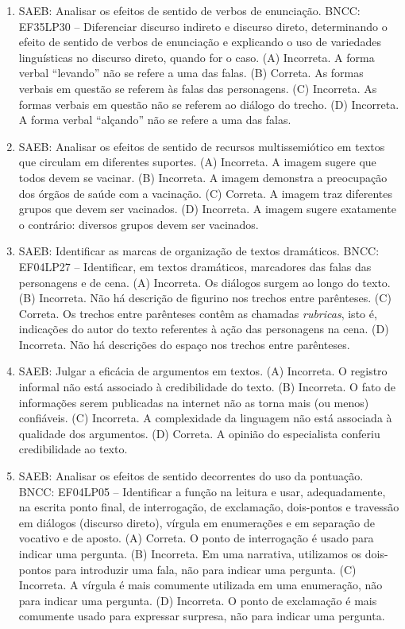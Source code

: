\begin{enumerate}
\item
SAEB: Analisar os efeitos de sentido de verbos de enunciação. BNCC: EF35LP30 -- Diferenciar discurso indireto e discurso direto, determinando o efeito de sentido de verbos de enunciação e explicando o uso de variedades linguísticas no discurso direto, quando for o caso. 
(A) Incorreta. A forma verbal ``levando'' não se refere a uma das falas. 
(B) Correta. As formas verbais em questão se referem às falas das personagens. 
(C) Incorreta. As formas verbais em questão não se referem ao diálogo do trecho. 
(D) Incorreta. A forma verbal  ``alçando'' não se refere a uma das falas.

\item
SAEB: Analisar os efeitos de sentido de recursos multissemiótico em textos que circulam em diferentes suportes. 
(A) Incorreta. A imagem sugere que todos devem se vacinar. 
(B) Incorreta.  A imagem demonstra a preocupação dos órgãos de saúde com a vacinação. 
(C) Correta. A imagem traz diferentes grupos que devem ser vacinados. 
(D) Incorreta. A imagem sugere exatamente o contrário: diversos grupos devem ser vacinados.

\item
SAEB: Identificar as marcas de organização de textos dramáticos. BNCC: EF04LP27 -- Identificar, em textos dramáticos, marcadores das falas das personagens e de cena.
(A) Incorreta. Os diálogos surgem ao longo do texto. 
(B) Incorreta. Não há descrição de figurino nos trechos entre parênteses. 
(C) Correta. Os trechos entre parênteses contêm as chamadas \textit{rubricas}, isto é, indicações do autor do texto referentes à ação das personagens na cena. 
(D) Incorreta. Não há descrições do espaço nos trechos entre parênteses.

\item
SAEB: Julgar a eficácia de argumentos em textos. 
(A) Incorreta. O registro informal não está associado à credibilidade do texto. 
(B) Incorreta. O fato de informações serem publicadas na internet não as torna mais (ou menos) confiáveis. 
(C) Incorreta. A complexidade da linguagem não está associada à qualidade dos argumentos. 
(D) Correta. A opinião do especialista conferiu credibilidade ao texto.

\item
SAEB: Analisar os efeitos de sentido decorrentes do uso da pontuação. BNCC: EF04LP05 -- Identificar a função na leitura e usar, adequadamente, na escrita ponto final, de interrogação, de exclamação, dois-pontos e travessão em diálogos (discurso direto), vírgula em enumerações e em separação de vocativo e de aposto. 
(A) Correta. O ponto de interrogação é usado para indicar uma pergunta. 
(B) Incorreta. Em uma narrativa, utilizamos os dois-pontos para introduzir uma fala, não para indicar uma pergunta. 
(C) Incorreta. A vírgula é mais comumente utilizada em uma enumeração, não para indicar uma pergunta. 
(D) Incorreta. O ponto de exclamação é mais comumente usado para expressar surpresa, não para indicar uma pergunta.


\end{enumerate}
